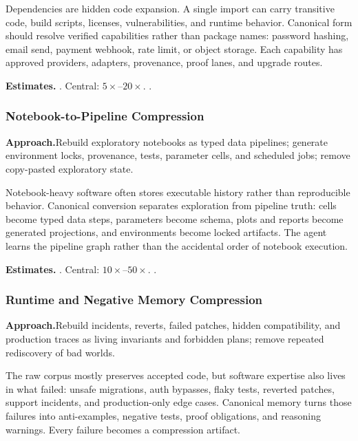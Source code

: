 Dependencies are hidden code expansion.  A single import can carry
transitive code, build scripts, licenses, vulnerabilities, and runtime
behavior.  Canonical form should resolve verified capabilities rather
than package names: password hashing, email send, payment webhook,
rate limit, or object storage.  Each capability has approved providers,
adapters, provenance, proof lanes, and upgrade routes.

\smallskip\noindent
\textbf{Estimates.}\quad
{}.\quad
Central: $5\times$--$20\times$.\quad
{}.

\subsubsection{Notebook-to-Pipeline Compression}
\label{ssec:notebook-pipeline}

\smallskip\noindent
\textbf{Approach.}\quad Rebuild exploratory notebooks as typed data pipelines; generate environment locks, provenance, tests, parameter cells, and scheduled jobs; remove copy-pasted exploratory state.

Notebook-heavy software often stores executable history rather than
reproducible behavior.  Canonical conversion separates exploration from
pipeline truth: cells become typed data steps, parameters become schema,
plots and reports become generated projections, and environments become
locked artifacts.  The agent learns the pipeline graph rather than the
accidental order of notebook execution.

\smallskip\noindent
\textbf{Estimates.}\quad
{}.\quad
Central: $10\times$--$50\times$.\quad
{}.

\subsubsection{Runtime and Negative Memory Compression}
\label{ssec:runtime-negative-memory}

\smallskip\noindent
\textbf{Approach.}\quad Rebuild incidents, reverts, failed patches, hidden compatibility, and production traces as living invariants and forbidden plans; remove repeated rediscovery of bad worlds.

The raw corpus mostly preserves accepted code, but software expertise
also lives in what failed: unsafe migrations, auth bypasses, flaky
tests, reverted patches, support incidents, and production-only edge
cases.  Canonical memory turns those failures into anti-examples,
negative tests, proof obligations, and reasoning warnings.  Every
failure becomes a compression artifact.

